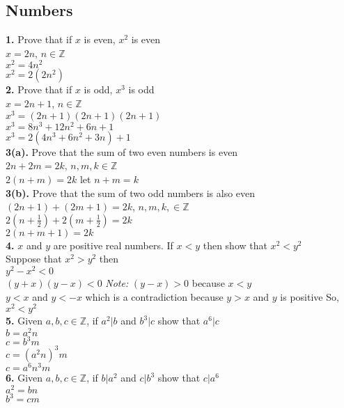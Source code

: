 \documentclass[a4paper,12pt]{article}
\begin{document}
\subsection{Numbers}
\textbf{1.} Prove that if $x$ is even, $x^2$ is even\smallskip\\
$x=2n$, $n \in \mathbb{Z}$\\
$x^2=4n^2$\\
$x^2=2(2n^2)$\bigskip\\
\textbf{2.} Prove that if $x$ is odd, $x^3$ is odd\smallskip\\
$x=2n+1$, $n \in \mathbb{Z}$\\
$x^3=(2n+1)(2n+1)(2n+1)$\\
$x^3=8n^3+12n^2+6n+1$\\
$x^3=2(4n^3+6n^2+3n)+1$\bigskip\\
\textbf{3(a).} Prove that the sum of two even numbers is even\smallskip\\
$2n + 2m = 2k$, $n, m, k \in \mathbb{Z}$\\
$2(n+m) = 2k$ let $n+m=k$\bigskip\\
\textbf{3(b).} Prove that the sum of two odd numbers is also even\smallskip\\
$(2n+1) + (2m+1) = 2k$, $n, m , k, \in \mathbb{Z}$\\
$2(n+\frac{1}{2}) + 2(m+\frac{1}{2})=2k$\\
$2(n+m+1)=2k$\bigskip\\
\textbf{4.} $x$ and $y$ are positive real numbers. If $x < y$ then show that $x^2 < y^2$\smallskip\\
Suppose that $x^2 > y^2$ then\\
$y^2-x^2<0$\\
$(y+x)(y-x)<0$ \hspace{25pt} \textit{Note:} $(y-x)>0$ because $x < y$\\
$y<x$ and $y<-x$ which is a contradiction because $y > x$ and $y$ is positive
So, $x^2 < y^2$\bigskip\\
\textbf{5.} Given $a, b, c \in \mathbb Z$, if $a^2 | b$ and $b^3 | c$ show that $a^6 | c$\smallskip\\
$b=a^2n$\\
$c=b^3m$\\
$c=(a^2n)^3m$\\
$c=a^6n^3m$\bigskip\\
\textbf{6.} Given $a, b, c \in \mathbb{Z}$, if $b|a^2$ and $c|b^3$ show that $c|a^6$\smallskip\\
$a^2 = bn$\\
$b^3 = cm$\\
\end{document}
